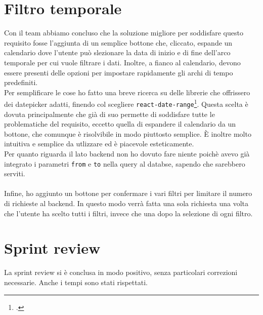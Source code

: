 \section{Filtro temporale}
Con il team abbiamo concluso che la soluzione migliore per soddisfare questo requisito fosse l'aggiunta di un semplice bottone che, cliccato, espande un calendario dove l'utente può slezionare la data di inizio e di fine dell'arco temporale per cui vuole filtrare i dati. Inoltre, a fianco al calendario, devono essere presenti delle opzioni per impostare rapidamente gli archi di tempo predefiniti. \\
Per semplificare le cose ho fatto una breve ricerca su delle librerie che offrissero dei datepicker adatti, finendo col scegliere \texttt{react-date-range}\footcite{site:rdr}. Questa scelta è dovuta principalmente che già di suo permette di soddisfare tutte le problematiche del requisito, eccetto quella di espandere il calendario da un bottone, che comunque è risolvibile in modo piuttosto semplice. È inoltre molto intuitiva e semplice da utlizzare ed è piacevole esteticamente.\\
Per quanto riguarda il lato backend non ho dovuto fare niente poichè avevo già integrato i parametri \texttt{from} e \texttt{to} nella query al databse, sapendo che sarebbero serviti.\\\\
Infine, ho aggiunto un bottone per confermare i vari filtri per limitare il numero di richieste al backend. In questo modo verrà fatta una sola richiesta una volta che l'utente ha scelto tutti i filtri, invece che una dopo la selezione di ogni filtro.

\section{Sprint review}
La sprint review si è conclusa in modo positivo, senza particolari correzioni necessarie. Anche i tempi sono stati rispettati.